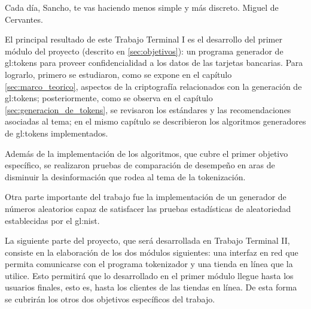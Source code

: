 %
%

\label{sec:conclusiones}
{%
  Cada día, Sancho, te vas haciendo menos simple y más discreto.%
}
{%
   Miguel de Cervantes.%
}

\noindent

El principal resultado de este Trabajo Terminal I es el desarrollo del primer
módulo del proyecto (descrito en \ref{sec:objetivos}): un programa generador de
\glspl{gl:token} para proveer confidencialidad a los datos de las tarjetas
bancarias. Para lograrlo, primero se estudiaron, como se expone en el capítulo
\ref{sec:marco_teorico}, aspectos de la criptografía relacionados con la
generación de \glspl{gl:token}; posteriormente, como se observa en el capítulo
\ref{sec:generacion_de_tokens}, se revisaron los estándares y las
recomendaciones asociadas al tema; en el mismo capítulo se describieron los
algoritmos generadores de \glspl{gl:token} implementados.

Además de la implementación de los algoritmos, que cubre el primer objetivo
específico, se realizaron pruebas de comparación de desempeño en aras de
disminuir la desinformación que rodea al tema de la tokenización.

Otra parte importante del trabajo fue la implementación de un generador de
números aleatorios capaz de satisfacer las pruebas estadísticas de aleatoriedad
establecidas por el \gls{gl:nist}\footnotemark.


La siguiente parte del proyecto, que será desarrollada en Trabajo Terminal II,
consiste en la elaboración de los dos módulos siguientes: una interfaz en red
que permita comunicarse con el programa tokenizador y una tienda en línea que la
utilice. Esto permitirá que lo desarrollado en el primer módulo llegue hasta los
usuarios finales, esto es, hasta los clientes de las tiendas en línea.
De esta forma se cubrirán los otros dos objetivos específicos del trabajo.
